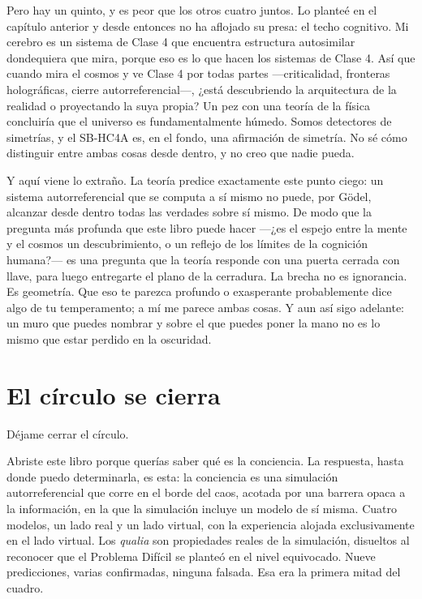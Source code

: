 \documentclass[11pt, twoside, openright]{book}
\begin{document}
Pero hay un quinto, y es peor que los otros cuatro juntos. Lo planteé en el capítulo anterior y desde entonces no ha aflojado su presa: el techo cognitivo. Mi cerebro es un sistema de Clase 4 que encuentra estructura autosimilar dondequiera que mira, porque eso es lo que hacen los sistemas de Clase 4. Así que cuando mira el cosmos y ve Clase 4 por todas partes ---criticalidad, fronteras holográficas, cierre autorreferencial---, ¿está descubriendo la arquitectura de la realidad o proyectando la suya propia? Un pez con una teoría de la física concluiría que el universo es fundamentalmente húmedo. Somos detectores de simetrías, y el SB-HC4A es, en el fondo, una afirmación de simetría. No sé cómo distinguir entre ambas cosas desde dentro, y no creo que nadie pueda.

Y aquí viene lo extraño. La teoría predice exactamente este punto ciego: un sistema autorreferencial que se computa a sí mismo no puede, por Gödel, alcanzar desde dentro todas las verdades sobre sí mismo. De modo que la pregunta más profunda que este libro puede hacer ---¿es el espejo entre la mente y el cosmos un descubrimiento, o un reflejo de los límites de la cognición humana?--- es una pregunta que la teoría responde con una puerta cerrada con llave, para luego entregarte el plano de la cerradura. La brecha no es ignorancia. Es geometría. Que eso te parezca profundo o exasperante probablemente dice algo de tu temperamento; a mí me parece ambas cosas. Y aun así sigo adelante: un muro que puedes nombrar y sobre el que puedes poner la mano no es lo mismo que estar perdido en la oscuridad.

\section*{El círculo se cierra}

Déjame cerrar el círculo.

Abriste este libro porque querías saber qué es la conciencia. La respuesta, hasta donde puedo determinarla, es esta: la conciencia es una simulación autorreferencial que corre en el borde del caos, acotada por una barrera opaca a la información, en la que la simulación incluye un modelo de sí misma. Cuatro modelos, un lado real y un lado virtual, con la experiencia alojada exclusivamente en el lado virtual. Los \textit{qualia} son propiedades reales de la simulación, disueltos al reconocer que el Problema Difícil se planteó en el nivel equivocado. Nueve predicciones, varias confirmadas, ninguna falsada. Esa era la primera mitad del cuadro.
\end{document}
